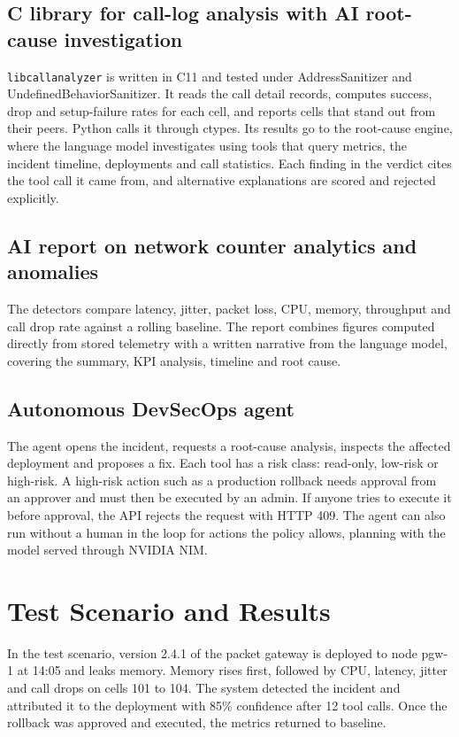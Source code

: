 \documentclass[11pt,a4paper]{article}
\begin{document}
\subsection{C library for call-log analysis with AI root-cause investigation}
\texttt{libcallanalyzer} is written in C11 and tested under AddressSanitizer and UndefinedBehaviorSanitizer. It reads the call detail records, computes success, drop and setup-failure rates for each cell, and reports cells that stand out from their peers. Python calls it through ctypes. Its results go to the root-cause engine, where the language model investigates using tools that query metrics, the incident timeline, deployments and call statistics. Each finding in the verdict cites the tool call it came from, and alternative explanations are scored and rejected explicitly.

\subsection{AI report on network counter analytics and anomalies}
The detectors compare latency, jitter, packet loss, CPU, memory, throughput and call drop rate against a rolling baseline. The report combines figures computed directly from stored telemetry with a written narrative from the language model, covering the summary, KPI analysis, timeline and root cause.

\subsection{Autonomous DevSecOps agent}
The agent opens the incident, requests a root-cause analysis, inspects the affected deployment and proposes a fix. Each tool has a risk class: read-only, low-risk or high-risk. A high-risk action such as a production rollback needs approval from an approver and must then be executed by an admin. If anyone tries to execute it before approval, the API rejects the request with HTTP 409. The agent can also run without a human in the loop for actions the policy allows, planning with the model served through NVIDIA NIM.

\section{Test Scenario and Results}
In the test scenario, version 2.4.1 of the packet gateway is deployed to node pgw-1 at 14:05 and leaks memory. Memory rises first, followed by CPU, latency, jitter and call drops on cells 101 to 104. The system detected the incident and attributed it to the deployment with 85\% confidence after 12 tool calls. Once the rollback was approved and executed, the metrics returned to baseline.
\end{document}
